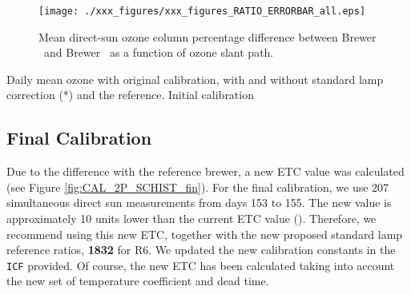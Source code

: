 \begin{figure}[hbtp!]
\begin{center}   
		\texttt{[image: ./xxx\_figures/xxx\_figures\_RATIO\_ERRORBAR\_all.eps]}
		\caption{Mean direct-sun ozone column percentage difference between Brewer \brwname\ and Brewer \brwref\ as a function of ozone slant path.} 
		\label{fig:RATIO_ERRORBAR_blind}
\end{center}
\end{figure}


\begin{table}[hbtp!] \centering
		\caption{Daily mean ozone with original calibration, with and without standard lamp correction (*) and the reference. Initial calibration}
		\label{tab:table_ETCdata_blind}
		
\end{table}
\newpage

\subsection{Final Calibration}
Due to the difference with the reference brewer, a new ETC value was calculated (see Figure \ref{fig:CAL_2P_SCHIST_fin}). For the final calibration, we use 207 simultaneous direct sun measurements from days 153 to 155. The new value is approximately 10 units lower than the current ETC value (\textbf{\ETCorig}). Therefore, we recommend using this new ETC, together with the new proposed standard lamp reference ratios, \textbf{1832} for R6. We updated the new calibration constants in the \texttt{ICF} provided. Of course, the new ETC has been calculated taking into account the new set of temperature coefficient and dead time.


